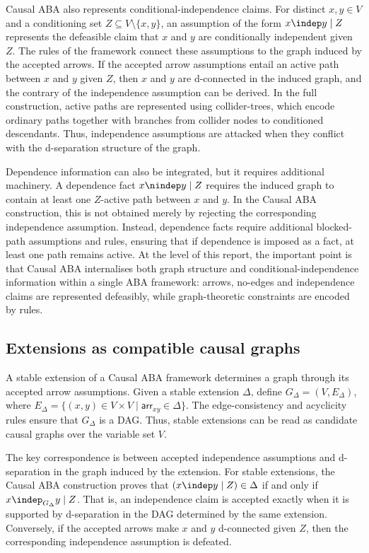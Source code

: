 Causal ABA also represents conditional-independence claims. For distinct \(x,y \in V\) and a conditioning set \(Z \subseteq V \setminus \{x,y\}\), an assumption of the form \(x \indep y \mid Z\) represents the defeasible claim that \(x\) and \(y\) are conditionally independent given \(Z\). The rules of the framework connect these assumptions to the graph induced by the accepted arrows. If the accepted arrow assumptions entail an active path between \(x\) and \(y\) given \(Z\), then \(x\) and \(y\) are d-connected in the induced graph, and the contrary of the independence assumption can be derived. In the full construction, active paths are represented using collider-trees, which encode ordinary paths together with branches from collider nodes to conditioned descendants. Thus, independence assumptions are attacked when they conflict with the d-separation structure of the graph.

Dependence information can also be integrated, but it requires additional machinery. A dependence fact \(x \nindep y \mid Z\) requires the induced graph to contain at least one \(Z\)-active path between \(x\) and \(y\). In the Causal ABA construction, this is not obtained merely by rejecting the corresponding independence assumption. Instead, dependence facts require additional blocked-path assumptions and rules, ensuring that if dependence is imposed as a fact, at least one path remains active. At the level of this report, the important point is that Causal ABA internalises both graph structure and conditional-independence information within a single ABA framework: arrows, no-edges and independence claims are represented defeasibly, while graph-theoretic constraints are encoded by rules.

\subsection{Extensions as compatible causal graphs}

A stable extension of a Causal ABA framework determines a graph through its accepted arrow assumptions. Given a stable extension \(\Delta\), define \(G_{\Delta} = (V,E_{\Delta})\), where \(E_{\Delta} = \{(x,y) \in V \times V \mid \mathsf{arr}_{xy} \in \Delta\}\). The edge-consistency and acyclicity rules ensure that \(G_{\Delta}\) is a DAG. Thus, stable extensions can be read as candidate causal graphs over the variable set \(V\).

The key correspondence is between accepted independence assumptions and d-separation in the graph induced by the extension. For stable extensions, the Causal ABA construction proves that \((x \indep y \mid Z) \in \Delta\) if and only if \(x \indep_{G_{\Delta}} y \mid Z\). That is, an independence claim is accepted exactly when it is supported by d-separation in the DAG determined by the same extension. Conversely, if the accepted arrows make \(x\) and \(y\) d-connected given \(Z\), then the corresponding independence assumption is defeated.

